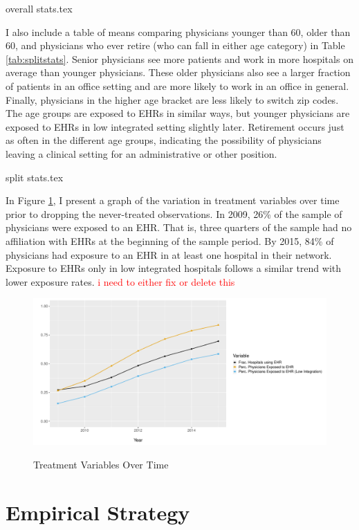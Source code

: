 \documentclass[11pt]{article}
\begin{document}
{overall stats.tex}


I also include a table of means comparing physicians younger than 60, older than 60, and physicians who ever retire (who can fall in either age category) in Table \ref{tab:splitstats}. Senior physicians see more patients and work in more hospitals on average than younger physicians. These older physicians also see a larger fraction of patients in an office setting and are more likely to work in an office in general. Finally, physicians in the higher age bracket are less likely to switch zip codes. The age groups are exposed to EHRs in similar ways, but younger physicians are exposed to EHRs in low integrated setting slightly later. Retirement occurs just as often in the different age groups, indicating the possibility of physicians leaving a clinical setting for an administrative or other position.

{split stats.tex}


In Figure \ref{fig:treatmentgraph}, I present a graph of the variation in treatment variables over time prior to dropping the never-treated observations. In 2009, 26\% of the sample of physicians were exposed to an EHR. That is, three quarters of the sample had no affiliation with EHRs at the beginning of the sample period. By 2015, 84\% of physicians had exposure to an EHR in at least one hospital in their network. Exposure to EHRs only in low integrated hospitals follows a similar trend with lower exposure rates. \textcolor{red}{i need to either fix or delete this}


\begin{figure}[ht]
\centering
    \caption{Treatment Variables Over Time}
    \includegraphics[scale=.6]{Objects/sum_stats_year.pdf}
    \label{fig:treatmentgraph}
\end{figure}


\section{Empirical Strategy}
\end{document}
